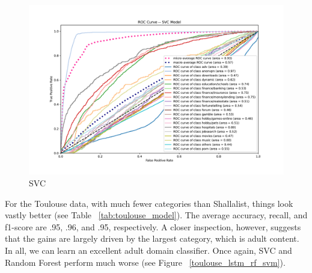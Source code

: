 \documentclass[12pt, letterpaper]{article}
\begin{document}
\begin{figure}[!htb]
\begin{minipage}[b]{0.3\textwidth}
	\includegraphics[width=\textwidth]{../figs/roc-shalla-2017-svc.pdf}\\SVC
	\end{minipage}
\end{figure}

For the Toulouse data, with much fewer categories than Shallalist, things look vastly better (see Table ~\ref{tab:toulouse_model}). The average accuracy, recall, and f1-score are .95, .96, and .95, respectively. A closer inspection, however, suggests that the gains are largely driven by the largest category, which is adult content. In all, we can learn an excellent adult domain classifier. Once again, SVC and Random Forest perform much worse (see Figure ~\ref{toulouse_lstm_rf_svm}).
\end{document}
